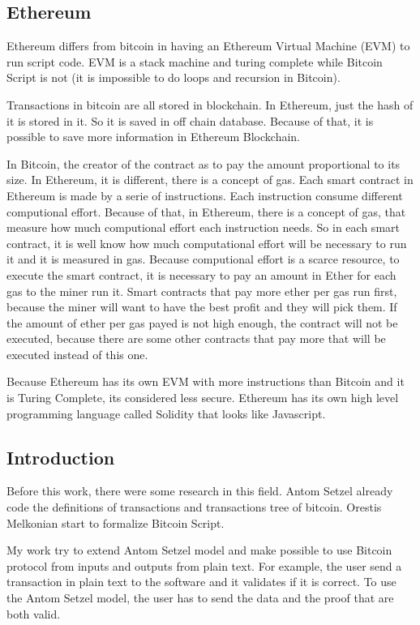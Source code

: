 \documentclass[12pt]{article}
\begin{document}
\subsection{Ethereum}

Ethereum differs from bitcoin in having an Ethereum Virtual Machine (EVM) to run script code.
EVM is a stack machine and turing complete while Bitcoin Script is not
(it is impossible to do loops and recursion in Bitcoin).

Transactions in bitcoin are all stored in blockchain.
In Ethereum, just the hash of it is stored in it.
So it is saved in off chain database.
Because of that, it is possible to save more information in Ethereum Blockchain.

In Bitcoin, the creator of the contract as to pay the amount proportional to its size.
In Ethereum, it is different, there is a concept of gas.
Each smart contract in Ethereum is made by a serie of instructions.
Each instruction consume different computional effort.
Because of that, in Ethereum, there is a concept of gas, that measure how much computional effort
each instruction needs.
So in each smart contract, it is well know how much computational effort will be necessary to run it
and it is measured in gas.
Because computional effort is a scarce resource, to execute the smart contract, it is necessary to
pay an amount in Ether for each gas to the miner run it.
Smart contracts that pay more ether per gas run first, because the miner will want to have the best
profit and they will pick them.
If the amount of ether per gas payed is not high enough, the contract will not be executed,
because there are some other contracts that pay more that will be executed instead of this one.

Because Ethereum has its own EVM with more instructions than Bitcoin and it is Turing Complete,
its considered less secure.
Ethereum has its own high level programming language called Solidity that looks like Javascript.

\subsection{Introduction}

Before this work, there were some research in this field.
Antom Setzel \cite{setzer2018modelling} already code the definitions of transactions and
transactions tree of bitcoin.
Orestis Melkonian start to formalize Bitcoin Script.

My work try to extend Antom Setzel model and make possible to use Bitcoin protocol
from inputs and outputs from plain text.
For example, the user send a transaction in plain text to the software and it validates if it is correct.
To use the Antom Setzel model, the user has to send the data and the proof that are both valid.
\end{document}
